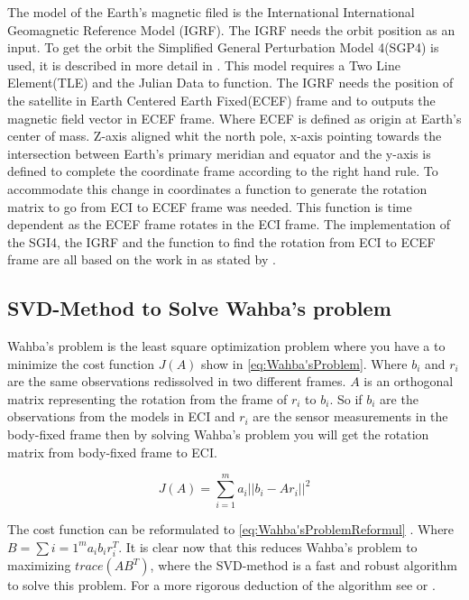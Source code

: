 The model of the Earth's magnetic filed is the International International Geomagnetic Reference Model (IGRF)\cite{IGRF}. The IGRF needs the orbit position as an input. To get the orbit the Simplified General Perturbation Model 4(SGP4) is used, it is described in more detail in \cite{SGM4}. This model requires a Two Line Element(TLE) and the Julian Data to function. The IGRF needs the position of the satellite in Earth Centered Earth Fixed(ECEF) frame and to outputs the magnetic field vector in ECEF frame. Where ECEF is defined as origin at Earth's center of mass. Z-axis aligned whit the north pole, x-axis pointing towards the intersection between Earth's primary meridian and equator and the y-axis is defined to complete the coordinate frame according to the right hand rule. To accommodate this change in coordinates a function to generate the rotation matrix to go from ECI to ECEF frame was needed. This function is time dependent as the ECEF frame rotates in the ECI frame. The implementation of the SGI4, the IGRF and the function to find the rotation from ECI to ECEF frame are all based on the work in \cite{aausatMasterThisis} as stated by \cite{DavidThesis}. 

\subsection{SVD-Method to Solve Wahba's problem}
Wahba's problem is the least square optimization problem where you have a to minimize the cost function $J(A)$ show in \autoref{eq:Wahba'sProblem}. Where $b_i$ and $r_i$ are the same observations redissolved in two different frames. $A$ is an orthogonal matrix representing the rotation from the frame of $r_i$ to $b_i$\cite{aausat}. So if $b_i$ are the observations from the models in ECI and $r_i$ are the sensor measurements in the body-fixed frame then by solving Wahba's problem you will get the rotation matrix from body-fixed frame to ECI.     

\begin{equation}\label{eq:Wahba'sProblem}
	J(A) = \sum\limits_{i=1}^{m}a_i||b_i - Ar_i||^2
\end{equation}

The cost function can be reformulated to \autoref{eq:Wahba'sProblemReformul} \cite{aausat}. Where $B = \sum{i=1}^{m}a_ib_ir_i^T$. It is clear now that this reduces Wahba's problem to maximizing $trace(AB^T)$, where the SVD-method is a fast and robust algorithm to solve this problem. For a more rigorous deduction of the algorithm see \cite{DavidThesis} or \cite{aausat}.

